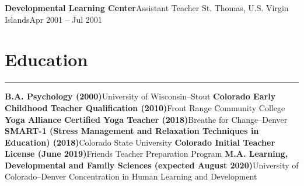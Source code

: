 \documentclass[letterpaper,10pt]{article}
\newcommand{\mblue}{\color{darkblue}}
\begin{document}
\vspace{1pc}
\textbf{Developmental Learning Center}\hfill Assistant Teacher
\smallbreak St. Thomas, U.S. Virgin Islands\hfill Apr 2001 -- Jul 2001


\section*{\mblue Education}

\vspace{-2.15pc}
{\hfill\mblue\rule{5.845in}{0.02cm}}

\vspace{1pc}
\textbf{B.A. Psychology (2000)}\hfill University of Wisconsin--Stout
\bigbreak\textbf{Colorado Early Childhood Teacher Qualification (2010)}\hfill Front Range Community College
\bigbreak\textbf{Yoga Alliance Certified Yoga Teacher (2018)}\hfill Breathe for Change--Denver
\bigbreak\textbf{SMART-1 (Stress Management and Relaxation Techniques in Education) (2018)}\hfill Colorado State University
\bigbreak\textbf{Colorado Initial Teacher License (June 2019)}\hfill Friends Teacher Preparation Program
\bigbreak\textbf{M.A. Learning, Developmental and Family Sciences (expected August 2020)}\hfill University of Colorado--Denver
\smallbreak Concentration in Human Learning and Development
\end{document}
